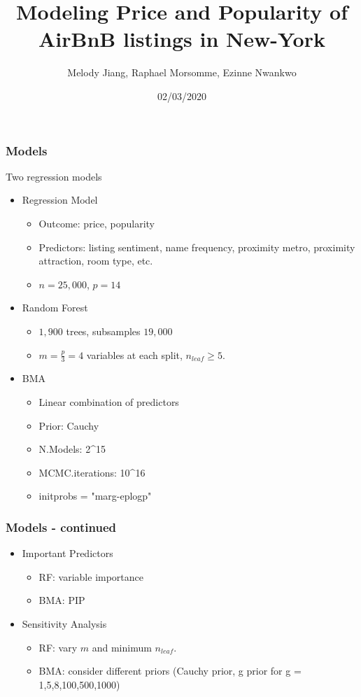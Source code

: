 \documentclass{beamer}
\title{Modeling Price and Popularity of AirBnB listings in New-York}
\author{Melody Jiang, Raphael Morsomme, Ezinne Nwankwo}
\institute{Department of Statistical Science, Duke University}
\date{02/03/2020}
\begin{document}
\frame{\titlepage}




\begin{frame}
\frametitle{Models}
Two regression models
\begin{itemize}
	\item Regression Model
	\begin{itemize}
		\item Outcome: price, popularity
		\item Predictors: listing sentiment, name frequency, proximity metro, proximity attraction, room type, etc.
		\item $n = 25,000$, $p=14$
	\end{itemize}
	\item Random Forest
	\begin{itemize}
		\item $1,900$ trees, subsamples $19,000$
		\item $m=\frac{p}{3}=4$ variables at each split, $n_{leaf} \ge 5$.
	\end{itemize}
	\item BMA
	\begin{itemize}
		\item Linear combination of predictors
		\item Prior: Cauchy
		\item N.Models: 2^15
		\item MCMC.iterations: 10^16
		\item initprobs = "marg-eplogp"
	\end{itemize}
\end{itemize}
\end{frame}



\begin{frame}
\frametitle{Models - continued}
\begin{itemize}
	\item Important Predictors
	\begin{itemize}
		\item RF: variable importance
		
		\item BMA: PIP
	\end{itemize}
	\item Sensitivity Analysis
	\begin{itemize}
		\item RF: vary $m$ and minimum $n_{leaf}$.
		\item BMA: consider different priors (Cauchy prior, g prior for g = 1,5,8,100,500,1000)
	\end{itemize}
\end{itemize}

\end{frame}
\end{document}
